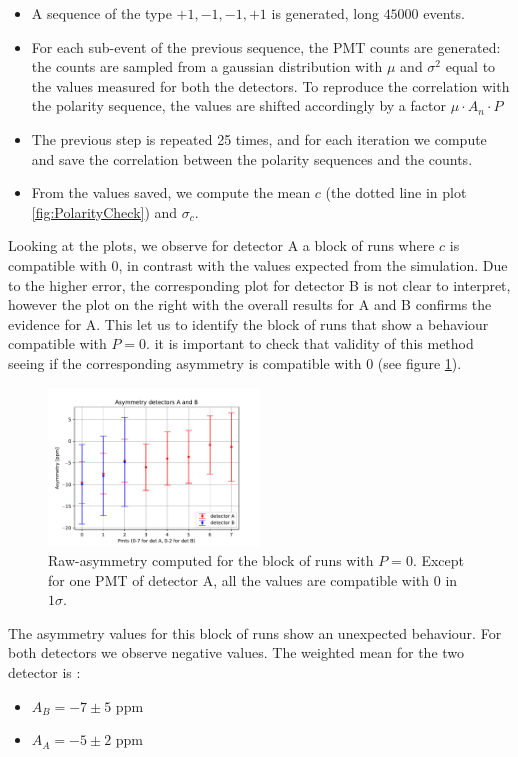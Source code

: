 \begin{itemize}
\item A sequence of the type $+1,-1,-1,+1$ is generated, long $45000$ events.
\item For each sub-event of the previous sequence, the PMT counts are generated: the counts are sampled from a gaussian distribution with $\mu$ and $\sigma^{2}$ equal to the values measured for both the detectors. To reproduce the correlation with the polarity sequence, the values are shifted accordingly  by a factor $\mu \cdot A_{n} \cdot P$  
\item The previous step is repeated 25 times, and for each iteration we compute and save the correlation between the polarity sequences and the counts.
\item From the values saved, we compute the mean $c$ (the dotted line in plot \ref{fig:PolarityCheck}) and $\sigma_{c}$.
\end{itemize}

Looking at the plots, we observe for detector A a block of runs where $c$ is compatible with 0, in contrast with the values expected from the simulation. Due to the higher error, the corresponding plot for detector B is not clear to interpret, however the plot on the right with the overall results for A and B confirms the evidence for A.
This let us to identify the block of runs that show a behaviour compatible with $P = 0$. it is important to check that validity of this method seeing if the corresponding asymmetry is compatible with $0$ (see figure \ref{fig:ZeroAsym}).

\begin{figure}[hbtp]
\centering
\includegraphics[width= 0.5\textwidth]{Analysis/Dataselection/Nopolarity.pdf}
\caption{Raw-asymmetry computed for the block of runs with $P = 0$. Except for one PMT of detector A, all the values are compatible with $0$ in $1\sigma$.}
\label{fig:ZeroAsym}
\end{figure}

The asymmetry values for this block of runs show an unexpected behaviour. For both detectors we observe negative values. The weighted mean for the two detector is :
\begin{itemize}
\item $A_{B} = -7 \pm 5$ ppm
\item $A_{A} = -5 \pm 2$ ppm
\end{itemize}

